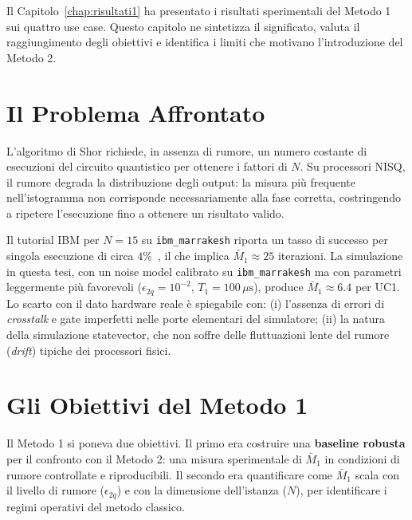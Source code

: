 \begin{onehalfspace}

Il Capitolo~\ref{chap:risultati1} ha presentato i risultati sperimentali del Metodo 1 sui quattro use case. Questo capitolo ne sintetizza il significato, valuta il raggiungimento degli obiettivi e identifica i limiti che motivano l'introduzione del Metodo 2.

\section{Il Problema Affrontato}
\label{sec:problema_m1}

L'algoritmo di Shor richiede, in assenza di rumore, un numero costante di esecuzioni del circuito quantistico per ottenere i fattori di $N$. Su processori \ac{NISQ}, il rumore degrada la distribuzione degli output: la misura più frequente nell'istogramma non corrisponde necessariamente alla fase corretta, costringendo a ripetere l'esecuzione fino a ottenere un risultato valido.

Il tutorial IBM per $N=15$ su \texttt{ibm\_marrakesh} riporta un tasso di successo per singola esecuzione di circa $4\%$~\cite{ibm_shor_tutorial}, il che implica $\bar{M}_1 \approx 25$ iterazioni. La simulazione in questa tesi, con un noise model calibrato su \texttt{ibm\_marrakesh} ma con parametri leggermente più favorevoli ($\epsilon_{2q} = 10^{-2}$, $T_1 = 100\,\mu\text{s}$), produce $\bar{M}_1 \approx 6.4$ per UC1. Lo scarto con il dato hardware reale è spiegabile con: (i) l'assenza di errori di \textit{crosstalk} e gate imperfetti nelle porte elementari del simulatore; (ii) la natura della simulazione statevector, che non soffre delle fluttuazioni lente del rumore (\textit{drift}) tipiche dei processori fisici.

\section{Gli Obiettivi del Metodo 1}
\label{sec:obiettivi_m1}

Il Metodo 1 si poneva due obiettivi. Il primo era costruire una \textbf{baseline robusta} per il confronto con il Metodo 2: una misura sperimentale di $\bar{M}_1$ in condizioni di rumore controllate e riproducibili. Il secondo era quantificare come $\bar{M}_1$ scala con il livello di rumore ($\epsilon_{2q}$) e con la dimensione dell'istanza ($N$), per identificare i regimi operativi del metodo classico.


\end{onehalfspace}
